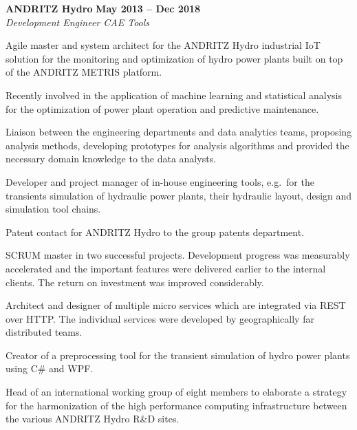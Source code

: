 \documentclass[line,11pt,a4paper]{../resume}
\begin{document}
\begin{resume}
\textbf{ANDRITZ Hydro} \hfill \textbf{May 2013 -- Dec 2018}
\vspace{2mm}\\\vspace{1mm}%
\textsl{Development Engineer CAE Tools}\\
\begin{list2}
  \item Agile master and system architect for the ANDRITZ Hydro industrial IoT
    solution for the monitoring and optimization of hydro power plants built on
    top of the ANDRITZ METRIS platform.

  \item Recently involved in the application of machine learning and
    statistical analysis for the optimization of power plant operation and
    predictive maintenance.

  \item Liaison between the engineering departments and data analytics teams,
    proposing analysis methods, developing prototypes for analysis algorithms
    and provided the necessary domain knowledge to the data analysts.

  \item Developer and project manager of in-house engineering tools, e.g.\ for
    the transients simulation of hydraulic power plants, their hydraulic
    layout, design and simulation tool chains.

  \item Patent contact for ANDRITZ Hydro to the group patents department.

  \item SCRUM master in two successful projects. Development progress was
    measurably accelerated and the important features were delivered earlier to
    the internal clients. The return on investment was improved considerably.

  \item Architect and designer of multiple micro services which are integrated
    via REST over HTTP. The individual services were developed by
    geographically far distributed teams.

  \item Creator of a preprocessing tool for the transient simulation of hydro
    power plants using C\# and WPF.

  \item Head of an international working group of eight members to elaborate a
    strategy for the harmonization of the high performance computing
    infrastructure between the various ANDRITZ Hydro R\&D sites.
\end{list2}


\end{resume}
\end{document}
